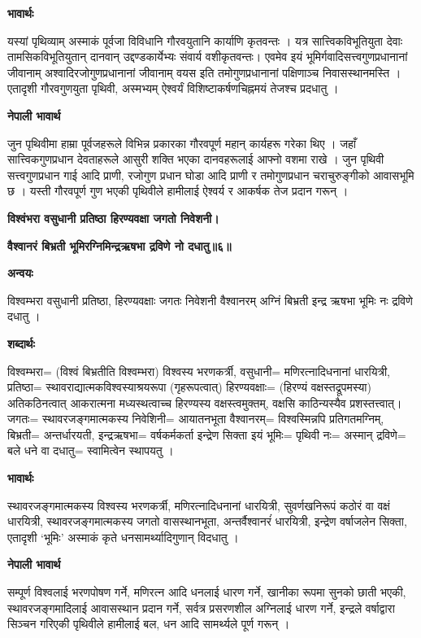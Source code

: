\documentclass[11pt, a5paper]{article}
\begin{document}
\textbf{भावार्थः}

यस्यां पृथिव्याम् अस्माकं पूर्वजा विविधानि गौरवयुतानि कार्याणि कृतवन्तः । यत्र सात्त्विकविभूतियुता देवाः तामसिकविभूतियुतान् दानवान् उद्दण्डकार्येभ्यः संवार्य वशीकृतवन्तः। एवमेव इयं भूमिर्गवादिसत्त्वगुणप्रधानानां जीवानाम् अश्वादिरजोगुणप्रधानानां जीवानाम् वयस इति तमोगुणप्रधानानां पक्षिणाञ्च निवासस्थानमस्ति । एतादृशी गौरवगुणयुता पृथिवी, अस्मभ्यम् ऐश्वर्यं विशिष्टाकर्षणचिह्नमयं तेजश्च प्रदधातु ।

\textbf{नेपाली भावार्थ}

जुन पृथिवीमा हाम्रा पूर्वजहरूले विभिन्न प्रकारका गौरवपूर्ण महान् कार्यहरू गरेका थिए । जहाँ सात्त्विकगुणप्रधान देवताहरूले आसुरी शक्ति भएका दानवहरूलाई आफ्नो वशमा राखे । जुन पृथिवी सत्त्वगुणप्रधान गाई आदि प्राणी, रजोगुण प्रधान घोडा आदि प्राणी र तमोगुणप्रधान चराचुरुङ्गीको आवासभूमि छ । यस्ती गौरवपूर्ण गुण भएकी पृथिवीले हामीलाई ऐश्वर्य र आकर्षक तेज प्रदान गरून् ।

\textbf{विश्वंभरा वसुधानी प्रतिष्ठा हिरण्यवक्षा जगतो निवेशनी।}

\textbf{वैश्वानरं बिभ्रती भूमिरग्निमिन्द्रऋषभा द्रविणे नो दधातु॥६॥}

\textbf{अन्वयः}

विश्वम्भरा वसुधानी प्रतिष्ठा, हिरण्यवक्षाः जगतः निवेशनी वैश्वानरम् अग्निं बिभ्रती इन्द्र ऋषभा भूमिः नः द्रविणे दधातु ।

\textbf{शब्दार्थः}

विश्वम्भरा= (विश्वं बिभ्रतीति विश्वम्भरा) विश्वस्य भरणकर्त्री, वसुधानी= मणिरत्नादिधनानां धारयित्री, प्रतिष्ठा= स्थावराद्यात्मकविश्वस्याश्रयरूपा (गृहरूपत्वात्) हिरण्यवक्षाः= (हिरण्यं वक्षस्तद्रूपमस्या) अतिकठिनत्वात् आकरात्मना मध्यस्थत्वाच्च हिरण्यस्य वक्षस्त्वमुक्तम्, वक्षसि काठिन्यस्यैव प्रशस्तत्त्वात्। जगतः= स्थावरजङ्गमात्मकस्य निवेशिनी= आयातनभूता वैश्वानरम्= विश्वस्मिन्नपि प्रतिगतमग्निम्, बिभ्रती= अन्तर्धारयती, इन्द्रऋषभा= वर्षकर्मकर्ता इन्द्रेण सिक्ता  इयं भूमिः= पृथिवी नः= अस्मान् द्रविणे= बले धने वा दधातु= स्वामित्वेन स्थापयतु ।

\textbf{भावार्थः}

स्थावरजङ्गमात्मकस्य विश्वस्य भरणकर्त्री, मणिरत्नादिधनानां धारयित्री, सुवर्णखनिरूपं कठोरं वा वक्षं धारयित्री, स्थावरजङ्गमात्मकस्य जगतो वासस्थानभूता, अन्तर्वैश्वानरंं धारयित्री, इन्द्रेण वर्षाजलेन सिक्ता, एतादृशी ‘भूमिः’ अस्माकं कृते धनसामर्थ्यादिगुणान् विदधातु ।

\textbf{नेपाली भावार्थ}

सम्पूर्ण विश्वलाई भरणपोषण गर्ने, मणिरत्न आदि धनलाई धारण गर्ने, खानीका रूपमा सुनको छाती भएकी, स्थावरजङ्गमादिलाई आवासस्थान प्रदान गर्ने, सर्वत्र प्रसरणशील अग्निलाई धारण गर्ने, इन्द्रले वर्षाद्वारा सिञ्चन गरिएकी पृथिवीले हामीलाई बल, धन आदि सामर्थ्यले पूर्ण गरून् ।
\end{document}

